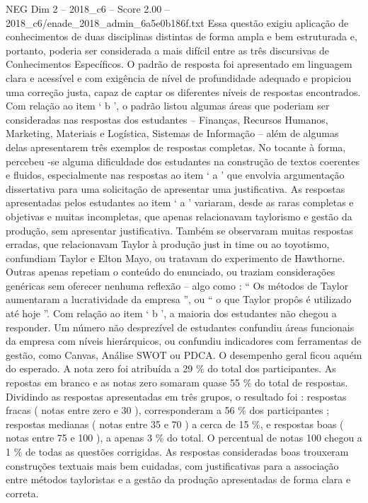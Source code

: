 \begin{textsample}{NEG Dim 2 – 2018\_c6 – Score 2.00 – 2018\_c6/enade\_2018\_admin\_6a5e0b186f.txt}
Essa questão exigiu aplicação de conhecimentos de duas disciplinas distintas de forma ampla e bem estruturada e, portanto, poderia ser considerada a mais difícil entre as três discursivas de Conhecimentos Específicos.
O padrão de resposta foi apresentado em linguagem clara e acessível e com exigência de nível de profundidade adequado e propiciou uma correção justa, capaz de captar os diferentes níveis de respostas encontrados.
Com relação ao item ‘ b ’, o padrão listou algumas áreas que poderiam ser consideradas nas respostas dos estudantes – Finanças, Recursos Humanos, Marketing, Materiais e Logística, Sistemas de Informação – além de algumas delas apresentarem três exemplos de respostas completas.
No tocante à forma, percebeu -se alguma dificuldade dos estudantes na construção de textos coerentes e fluidos, especialmente nas respostas ao item ‘ a ’ que envolvia argumentação dissertativa para uma solicitação de apresentar uma justificativa.
As respostas apresentadas pelos estudantes ao item ‘ a ’ variaram, desde as raras completas e objetivas e muitas incompletas, que apenas relacionavam taylorismo e gestão da produção, sem apresentar justificativa.
Também se observaram muitas respostas erradas, que relacionavam Taylor à produção just in time ou ao toyotismo, confundiam Taylor e Elton Mayo, ou tratavam do experimento de Hawthorne.
Outras apenas repetiam o conteúdo do enunciado, ou traziam considerações genéricas sem oferecer nenhuma reflexão – algo como : “ Os métodos de Taylor aumentaram a lucratividade da empresa ”, ou “ o que Taylor propôs é utilizado até hoje ”.
Com relação ao item ‘ b ’, a maioria dos estudantes não chegou a responder.
Um número não desprezível de estudantes confundiu áreas funcionais da empresa com níveis hierárquicos, ou confundiu indicadores com ferramentas de gestão, como Canvas, Análise SWOT ou PDCA.
O desempenho geral ficou aquém do esperado.
A nota zero foi atribuída a 29 \% do total dos participantes.
As repostas em branco e as notas zero somaram quase 55 \% do total de respostas.
Dividindo as respostas apresentadas em três grupos, o resultado foi : respostas fracas ( notas entre zero e 30 ), corresponderam a 56 \% dos participantes ; respostas medianas ( notas entre 35 e 70 ) a cerca de 15 \%, e respostas boas ( notas entre 75 e 100 ), a apenas 3 \% do total.
O percentual de notas 100 chegou a 1 \% de todas as questões corrigidas.
As respostas consideradas boas trouxeram construções textuais mais bem cuidadas, com justificativas para a associação entre métodos tayloristas e a gestão da produção apresentadas de forma clara e correta.

\end{textsample}
